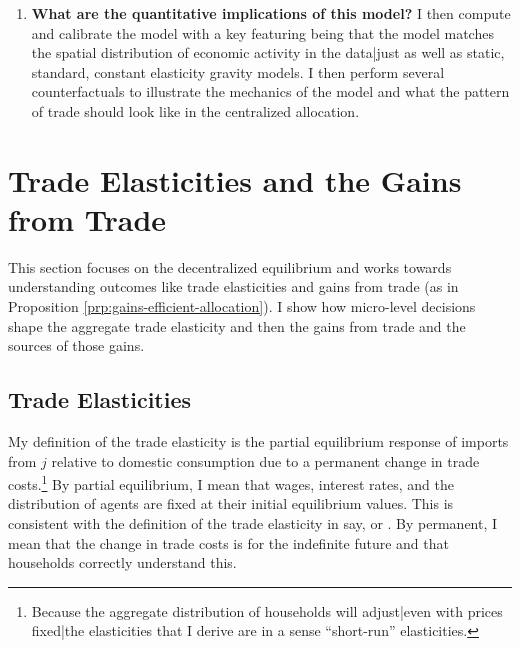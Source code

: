 \documentclass[12pt,pdftex]{article}
\begin{document}
\begin{onehalfspacing}
\begin{enumerate}
\item \textbf{What are the quantitative implications of this model?} I then compute and calibrate the model with a key featuring being that the model matches the spatial distribution of economic activity in the data|just as well as static, standard, constant elasticity gravity models. I then perform several counterfactuals to illustrate the mechanics of the model and what the pattern of trade should look like in the centralized allocation.
\end{enumerate}

\section{Trade Elasticities and the Gains from Trade}

This section focuses on the decentralized equilibrium and works towards understanding outcomes like trade elasticities and gains from trade (as in Proposition \ref{prp:gains-efficient-allocation}). I show how micro-level decisions shape the aggregate trade elasticity and then the gains from trade and the sources of those gains.

\subsection{Trade Elasticities}\label{sec:trade-elasticity}

My definition of the trade elasticity is the partial equilibrium response of imports from $j$ relative to domestic consumption due to a permanent change in trade costs.\footnote{Because the aggregate distribution of households will adjust|even with prices fixed|the elasticities that I derive are in a sense ``short-run'' elasticities.} By partial equilibrium, I mean that wages, interest rates, and the distribution of agents are fixed at their initial equilibrium values. This is consistent with the definition of the trade elasticity in say, \citet{arkolakis2012new} or \citet{simonovska2014elasticity}. By permanent, I mean that the change in trade costs is for the indefinite future and that households correctly understand this.


\end{onehalfspacing}
\end{document}
